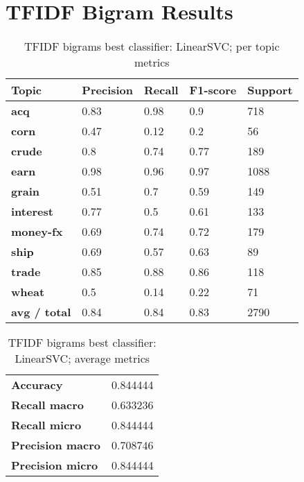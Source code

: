 \documentclass{article}
\begin{document}
\section{TFIDF Bigram Results}
\begin{table}[h]
\begin{tabular}{l|llll}
\textbf{Topic}       & \textbf{Precision} & \textbf{Recall} & \textbf{F1-score} & \textbf{Support} \\ \hline
\textbf{acq}         & 0.83               & 0.98            & 0.9               & 718              \\
\textbf{corn}        & 0.47               & 0.12            & 0.2               & 56               \\
\textbf{crude}       & 0.8                & 0.74            & 0.77              & 189              \\
\textbf{earn}        & 0.98               & 0.96            & 0.97              & 1088             \\
\textbf{grain}       & 0.51               & 0.7             & 0.59              & 149              \\
\textbf{interest}    & 0.77               & 0.5             & 0.61              & 133              \\
\textbf{money-fx}    & 0.69               & 0.74            & 0.72              & 179              \\
\textbf{ship}        & 0.69               & 0.57            & 0.63              & 89               \\
\textbf{trade}       & 0.85               & 0.88            & 0.86              & 118              \\
\textbf{wheat}       & 0.5                & 0.14            & 0.22              & 71               \\
\textbf{avg / total} & 0.84               & 0.84            & 0.83              & 2790            
\end{tabular}
\caption {TFIDF bigrams best classifier: LinearSVC; per topic metrics}
\end{table}

\begin{table}[h]
\begin{tabular}{l|l}
\textbf{Accuracy}        & 0.844444 \\
\textbf{Recall macro}    & 0.633236 \\
\textbf{Recall micro}    & 0.844444 \\
\textbf{Precision macro} & 0.708746 \\
\textbf{Precision micro} & 0.844444
\end{tabular}
\caption {TFIDF bigrams best classifier: LinearSVC; average metrics}
\end{table}
\end{document}
